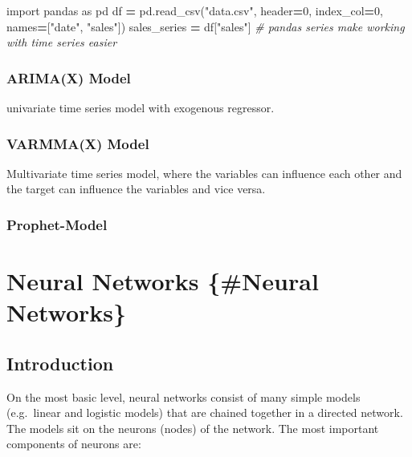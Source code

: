 \documentclass[
]{book}
\newenvironment{Shaded}{\begin{snugshade}}{\end{snugshade}}
\newcommand{\CommentTok}[1]{\textcolor[rgb]{0.56,0.35,0.01}{\textit{#1}}}
\newcommand{\DecValTok}[1]{\textcolor[rgb]{0.00,0.00,0.81}{#1}}
\newcommand{\ImportTok}[1]{#1}
\newcommand{\NormalTok}[1]{#1}
\newcommand{\OperatorTok}[1]{\textcolor[rgb]{0.81,0.36,0.00}{\textbf{#1}}}
\newcommand{\StringTok}[1]{\textcolor[rgb]{0.31,0.60,0.02}{#1}}
\begin{document}
\begin{Shaded}
\begin{Highlighting}[]
\ImportTok{import}\NormalTok{ pandas }\ImportTok{as}\NormalTok{ pd}
\NormalTok{df }\OperatorTok{=}\NormalTok{ pd.read\_csv(}\StringTok{"data.csv"}\NormalTok{, header}\OperatorTok{=}\DecValTok{0}\NormalTok{, index\_col}\OperatorTok{=}\DecValTok{0}\NormalTok{, names}\OperatorTok{=}\NormalTok{[}\StringTok{"date"}\NormalTok{, }\StringTok{"sales"}\NormalTok{])}
\NormalTok{sales\_series }\OperatorTok{=}\NormalTok{ df[}\StringTok{"sales"}\NormalTok{] }\CommentTok{\# pandas series make working with time series easier }
\end{Highlighting}
\end{Shaded}

\hypertarget{arimax-model}{%
\subsection{ARIMA(X) Model}\label{arimax-model}}

univariate time series model with exogenous regressor.

\hypertarget{varmmax-model}{%
\subsection{VARMMA(X) Model}\label{varmmax-model}}

Multivariate time series model, where the variables can influence each
other and the target can influence the variables and vice versa.

\hypertarget{prophet-model}{%
\subsection{Prophet-Model}\label{prophet-model}}

\hypertarget{neural-networks-neural-networks}{%
\chapter{Neural Networks \{\#Neural Networks\}}\label{neural-networks-neural-networks}}

\hypertarget{introduction}{%
\section{Introduction}\label{introduction}}

On the most basic level, neural networks consist of many simple models
(e.g.~linear and logistic models) that are chained together in a
directed network. The models sit on the neurons (nodes) of the network.
The most important components of neurons are:
\end{document}
